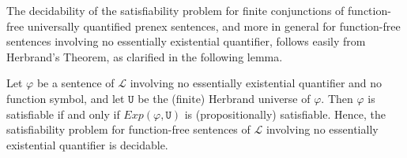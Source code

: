 \documentclass[a4paper]{llncs}
\newcommand{\Lang}{\ensuremath{\mathcal{L}\xspace}} %
\newcommand{\Univ}{\mathtt{U}}
\newcommand{\HExp}{Exp}
\begin{document}
The decidability of the satisfiability problem for finite conjunctions
of function-free universally quantified prenex sentences, and more in 
general for function-free sentences involving no essentially 
existential quantifier,
follows easily from Herbrand's Theorem, as clarified in the following lemma.
%
\begin{lemma}\label{HERSAT}
Let $\varphi$ be a sentence of $\Lang$ involving no essentially 
existential quantifier and no function symbol, and let $\Univ$ be the 
(finite) Herbrand universe of $\varphi$. Then $\varphi$ is 
satisfiable if and only if $\HExp(\varphi, \Univ)$ is 
(propositionally) satisfiable. Hence, the satisfiability problem for 
function-free sentences of $\Lang$ involving no essentially 
existential quantifier is decidable.
\end{lemma}
\end{document}
